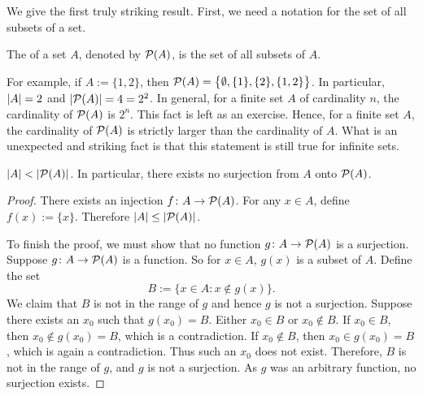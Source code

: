 \pagebreak[2]
We give the first truly striking result.
First, we need a notation for
the set of all subsets of a set.

\begin{defn}
The \emph{} of a set $A$, denoted by ${\mathcal{P}}(A)$,
 is the set of all subsets of $A$.
\end{defn}

For example, if $A := \{ 1,2\}$,
then ${\mathcal{P}}(A) = \bigl\{ \emptyset, \{ 1 \}, \{ 2 \}, \{ 1, 2 \} \bigr\}$.
In particular, $\left\lvert {A} \right\rvert = 2$ and $\left\lvert {{\mathcal{P}}(A)} \right\rvert = 4 = 2^2$.
In general,
for a finite set $A$ of cardinality $n$, the
cardinality of ${\mathcal{P}}(A)$ is $2^n$.
This fact is left as an exercise.  
Hence, for a finite set $A$,
the cardinality of ${\mathcal{P}}(A)$ is strictly
larger than the
cardinality of $A$.  What is an unexpected and
striking fact is that this statement is still true for infinite sets.

\begin{thm}
\label{cantorspowersetthm}
$\left\lvert {A} \right\rvert < \left\lvert {{\mathcal{P}}(A)} \right\rvert$.  In particular, there exists no surjection from
$A$ onto ${\mathcal{P}}(A)$.
\end{thm}

\begin{proof}
There exists an injection $f \colon A \to {\mathcal{P}}(A)$.
For any $x \in A$, define $f(x) := \{ x \}$.  Therefore
$\left\lvert {A} \right\rvert \leq \left\lvert {{\mathcal{P}}(A)} \right\rvert$.

To finish the proof, we must show that
no function $g \colon A \to {\mathcal{P}}(A)$ is a surjection.
Suppose 
$g \colon A \to {\mathcal{P}}(A)$ is a function.  So for $x \in A$,
$g(x)$ is a subset of $A$.  Define the set
\begin{equation*}
B := \bigl\{ x \in A : x \notin g(x) \bigr\} .
\end{equation*}
We claim that $B$ is not in the range of $g$ and hence $g$ is not a
surjection.  Suppose there exists an $x_0$ such that $g(x_0) = B$.
Either $x_0 \in B$ or $x_0 \notin B$.  If $x_0 \in B$, then $x_0 \notin
g(x_0) = B$, which is a contradiction.  If $x_0 \notin B$, then $x_0 \in
g(x_0) = B$, which is again a contradiction.  Thus such an $x_0$ does not
exist.  Therefore, $B$ is not in the range of $g$, and $g$ is not a
surjection.  As $g$ was an arbitrary function, no surjection exists.
\end{proof}

